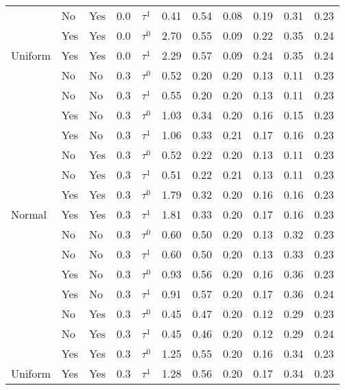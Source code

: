 \begin{tabular}[t]{lllrlrrrrrr}
 & No & Yes & 0.0 & $\tau^1$ & 0.41 & 0.54 & 0.08 & 0.19 & 0.31 & 0.23\\

 & Yes & Yes & 0.0 & $\tau^0$ & 2.70 & 0.55 & 0.09 & 0.22 & 0.35 & 0.24\\

\multirow{-8}{*}{\raggedright\arraybackslash Uniform} & Yes & Yes & 0.0 & $\tau^1$ & 2.29 & 0.57 & 0.09 & 0.24 & 0.35 & 0.24\\
\cmidrule{1-11}
 & No & No & 0.3 & $\tau^0$ & 0.52 & 0.20 & 0.20 & 0.13 & 0.11 & 0.23\\

 & No & No & 0.3 & $\tau^1$ & 0.55 & 0.20 & 0.20 & 0.13 & 0.11 & 0.23\\

 & Yes & No & 0.3 & $\tau^0$ & 1.03 & 0.34 & 0.20 & 0.16 & 0.15 & 0.23\\

 & Yes & No & 0.3 & $\tau^1$ & 1.06 & 0.33 & 0.21 & 0.17 & 0.16 & 0.23\\

 & No & Yes & 0.3 & $\tau^0$ & 0.52 & 0.22 & 0.20 & 0.13 & 0.11 & 0.23\\

 & No & Yes & 0.3 & $\tau^1$ & 0.51 & 0.22 & 0.21 & 0.13 & 0.11 & 0.23\\

 & Yes & Yes & 0.3 & $\tau^0$ & 1.79 & 0.32 & 0.20 & 0.16 & 0.16 & 0.23\\

\multirow{-8}{*}{\raggedright\arraybackslash Normal} & Yes & Yes & 0.3 & $\tau^1$ & 1.81 & 0.33 & 0.20 & 0.17 & 0.16 & 0.23\\
\cmidrule{1-11}
 & No & No & 0.3 & $\tau^0$ & 0.60 & 0.50 & 0.20 & 0.13 & 0.32 & 0.23\\

 & No & No & 0.3 & $\tau^1$ & 0.60 & 0.50 & 0.20 & 0.13 & 0.33 & 0.23\\

 & Yes & No & 0.3 & $\tau^0$ & 0.93 & 0.56 & 0.20 & 0.16 & 0.36 & 0.23\\

 & Yes & No & 0.3 & $\tau^1$ & 0.91 & 0.57 & 0.20 & 0.17 & 0.36 & 0.24\\

 & No & Yes & 0.3 & $\tau^0$ & 0.45 & 0.47 & 0.20 & 0.12 & 0.29 & 0.23\\

 & No & Yes & 0.3 & $\tau^1$ & 0.45 & 0.46 & 0.20 & 0.12 & 0.29 & 0.24\\

 & Yes & Yes & 0.3 & $\tau^0$ & 1.25 & 0.55 & 0.20 & 0.16 & 0.34 & 0.23\\

\multirow{-8}{*}{\raggedright\arraybackslash Uniform} & Yes & Yes & 0.3 & $\tau^1$ & 1.28 & 0.56 & 0.20 & 0.17 & 0.34 & 0.23\\
\bottomrule
\end{tabular}
